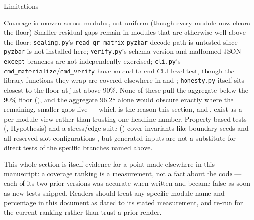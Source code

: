 \documentclass[
  ignorenonframetext,
]{beamer}
\begin{document}
\begin{frame}{Limitations}
\begin{block}{Coverage is uneven across modules, not uniform (though
every module now clears the floor)}
Smaller residual gaps remain in modules that are otherwise well above
the floor: \texttt{sealing.py}'s \texttt{read\_qr\_matrix}
\texttt{pyzbar}-decode path is untested since \texttt{pyzbar} is not
installed here; \texttt{verify.py}'s schema-version and malformed-JSON
\texttt{except} branches are not independently exercised;
\texttt{cli.py}'s \texttt{cmd\_materialize}/\texttt{cmd\_verify} have no
end-to-end CLI-level test, though the library functions they wrap are
covered elsewhere in  and
; \texttt{honesty.py} itself
sits closest to the floor at just above 90\%. None of these pull the
aggregate below the 90\% floor (), and the
aggregate 96.28 alone would obscure exactly where the remaining, smaller
gaps live --- which is the reason this section, and
, exist as a per-module view rather than
trusting one headline number. Property-based tests
(, Hypothesis) and a
stress/edge suite () cover
invariants like boundary seeds and all-reserved-slot configurations
, but generated
inputs are not a substitute for direct tests of the specific branches
named above.

This whole section is itself evidence for a point made elsewhere in this
manuscript: a coverage ranking is a measurement, not a fact about the
code --- each of its two prior versions was accurate when written and
became false as soon as new tests shipped. Readers should treat any
specific module name and percentage in this document as dated to its
stated measurement, and re-run  for the
current ranking rather than trust a prior render.
\end{block}


\end{frame}
\end{document}
